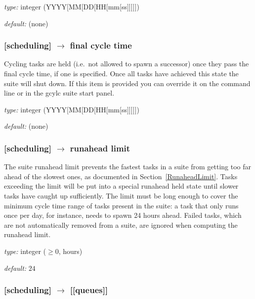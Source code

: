 \begin{myitemize}
    \item {\em type:} integer (YYYY[MM[DD[HH[mm[ss]]]]])
    \item {\em default:} (none)
\end{myitemize}

\subsubsection[final cycle time]{[scheduling] $\rightarrow$ final cycle time}

Cycling tasks are held (i.e.\ not allowed to spawn a successor) once they
pass the final cycle time, if one is specified. Once all tasks have
achieved this state the suite will shut down. If this item is provided you 
can override it on the command line or in the gcylc suite start panel.

\begin{myitemize}
    \item {\em type:} integer (YYYY[MM[DD[HH[mm[ss]]]]])
    \item {\em default:} (none)
\end{myitemize}

\subsubsection[runahead limit]{[scheduling] $\rightarrow$ runahead limit}

The suite runahead limit prevents the fastest tasks in a suite from
getting too far ahead of the slowest ones, as documented in
Section~\ref{RunaheadLimit}. Tasks exceeding the limit will be put into
a special runahead held state until slower tasks have caught up
sufficiently. The limit must be long enough to cover the minimum cycle
time range of tasks present in the suite: a task that only runs once per
day, for instance, needs to spawn 24 hours ahead.  Failed tasks, which
are not automatically removed from a suite, are ignored when computing
the runahead limit. 
\begin{myitemize}
    \item {\em type:} integer ($\geq 0$, hours)
    \item {\em default:} $24$
\end{myitemize}

\subsubsection[{[[}queues{]]}]{[scheduling] $\rightarrow$ [[queues]]}


